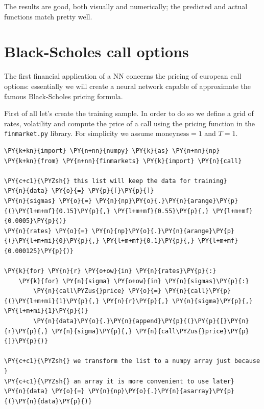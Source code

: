     The results are good, both visually and numerically; the predicted and
actual functions match pretty well.

\section{Black-Scholes call options}\label{black-scholes-call-options}

The first financial application of a NN concerns the pricing of european
call options: essentially we will create a neural network capable of
approximate the famous Black-Scholes pricing formula.

First of all let's create the training sample. In order to do so we
define a grid of rates, volatility and compute the price of a call using
the pricing function in the \texttt{finmarket.py} library. For
simplicity we assume \(\mathrm{moneyness}=1\) and \(T=1\).

    \begin{tcolorbox}[breakable, size=fbox, boxrule=1pt, pad at break*=1mm,colback=cellbackground, colframe=cellborder]
\begin{Verbatim}[commandchars=\\\{\}]
\PY{k+kn}{import} \PY{n+nn}{numpy} \PY{k}{as} \PY{n+nn}{np}
\PY{k+kn}{from} \PY{n+nn}{finmarkets} \PY{k}{import} \PY{n}{call}

\PY{c+c1}{\PYZsh{} this list will keep the data for training}
\PY{n}{data} \PY{o}{=} \PY{p}{[}\PY{p}{]}
\PY{n}{sigmas} \PY{o}{=} \PY{n}{np}\PY{o}{.}\PY{n}{arange}\PY{p}{(}\PY{l+m+mf}{0.15}\PY{p}{,} \PY{l+m+mf}{0.55}\PY{p}{,} \PY{l+m+mf}{0.0005}\PY{p}{)}
\PY{n}{rates} \PY{o}{=} \PY{n}{np}\PY{o}{.}\PY{n}{arange}\PY{p}{(}\PY{l+m+mi}{0}\PY{p}{,} \PY{l+m+mf}{0.1}\PY{p}{,} \PY{l+m+mf}{0.000125}\PY{p}{)}

\PY{k}{for} \PY{n}{r} \PY{o+ow}{in} \PY{n}{rates}\PY{p}{:}
    \PY{k}{for} \PY{n}{sigma} \PY{o+ow}{in} \PY{n}{sigmas}\PY{p}{:}
        \PY{n}{call\PYZus{}price} \PY{o}{=} \PY{n}{call}\PY{p}{(}\PY{l+m+mi}{1}\PY{p}{,} \PY{n}{r}\PY{p}{,} \PY{n}{sigma}\PY{p}{,} \PY{l+m+mi}{1}\PY{p}{)}
        \PY{n}{data}\PY{o}{.}\PY{n}{append}\PY{p}{(}\PY{p}{[}\PY{n}{r}\PY{p}{,} \PY{n}{sigma}\PY{p}{,} \PY{n}{call\PYZus{}price}\PY{p}{]}\PY{p}{)}
        
\PY{c+c1}{\PYZsh{} we transform the list to a numpy array just because }
\PY{c+c1}{\PYZsh{} an array it is more convenient to use later}
\PY{n}{data} \PY{o}{=} \PY{n}{np}\PY{o}{.}\PY{n}{asarray}\PY{p}{(}\PY{n}{data}\PY{p}{)}
\end{Verbatim}
\end{tcolorbox}

